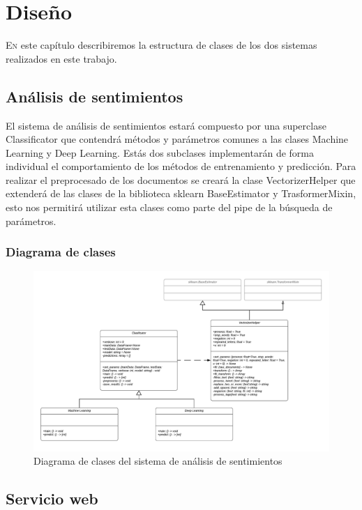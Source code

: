 
\chapter{Diseño}

\lettrine{E}{n} este capítulo describiremos la estructura de clases de los dos sistemas realizados en este trabajo.

\section{Análisis de sentimientos}

El sistema de análisis de sentimientos estará compuesto por una superclase Classificator que contendrá métodos y parámetros comunes a las clases Machine Learning y Deep Learning. Estás dos subclases implementarán de forma individual el comportamiento de los métodos de entrenamiento y predicción. Para realizar el preprocesado de los documentos se creará la clase VectorizerHelper que extenderá de las clases de la biblioteca sklearn BaseEstimator y TrasformerMixin, esto nos permitirá utilizar esta clases como parte del pipe de la búsqueda de parámetros.

\subsection{Diagrama de clases}

\begin{figure}[H]
	\centering
	\includegraphics[width=1\textwidth]{imaxes/saClases.png}
	\caption{Diagrama de clases del sistema de análisis de sentimientos}
	\label{saClases}
\end{figure}

\section{Servicio web}

